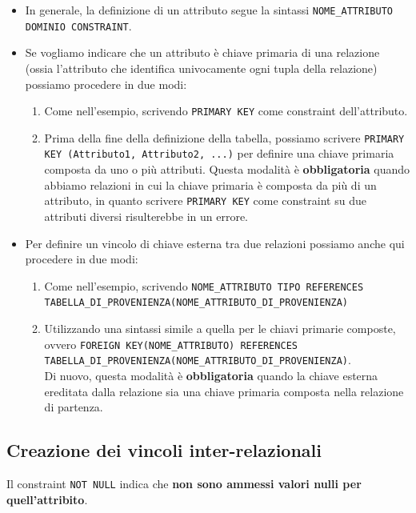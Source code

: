 \documentclass[12pt]{report}
\begin{document}
	\begin{itemize}
		\item In generale, la definizione di un attributo segue la sintassi \texttt{NOME\_ATTRIBUTO DOMINIO CONSTRAINT}.
		
		\item Se vogliamo indicare che un attributo è chiave primaria di una relazione (ossia l'attributo che identifica univocamente ogni tupla della relazione) possiamo procedere in due modi:
		\begin{enumerate}
			\item Come nell'esempio, scrivendo \texttt{PRIMARY KEY} come constraint dell'attributo.
			
			\item Prima della fine della definizione della tabella, possiamo scrivere \texttt{PRIMARY KEY (Attributo1, Attributo2, ...)} per definire una chiave primaria composta da uno o più attributi. Questa modalità è \textbf{obbligatoria} quando abbiamo relazioni in cui la chiave primaria è composta da più di un attributo, in quanto scrivere \texttt{PRIMARY KEY} come constraint su due attributi diversi risulterebbe in un errore.
		\end{enumerate}
		
		\item Per definire un vincolo di chiave esterna tra due relazioni possiamo anche qui procedere in due modi:
		\begin{enumerate}
			\item Come nell'esempio, scrivendo \texttt{NOME\_ATTRIBUTO TIPO REFERENCES}\\
			\texttt{TABELLA\_DI\_PROVENIENZA(NOME\_ATTRIBUTO\_DI\_PROVENIENZA)}
			
			\item Utilizzando una sintassi simile a quella per le chiavi primarie composte, ovvero \texttt{FOREIGN KEY(NOME\_ATTRIBUTO) REFERENCES}\\
			\texttt{TABELLA\_DI\_PROVENIENZA(NOME\_ATTRIBUTO\_DI\_PROVENIENZA)}.\\
			Di nuovo, questa modalità è \textbf{obbligatoria} quando la chiave esterna ereditata dalla relazione sia una chiave primaria composta nella relazione di partenza.
		\end{enumerate}
		
	\end{itemize}
	
	\subsection{Creazione dei vincoli inter-relazionali}
	Il constraint \texttt{NOT NULL} indica che \textbf{non sono ammessi valori nulli per quell'attribito}.
	
\end{document}
